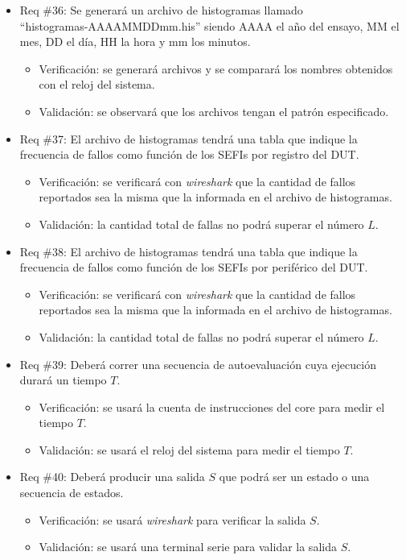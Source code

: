 \documentclass[
11pt, %
]{charter}
\begin{document}
\begin{itemize}
\item Req \#36: Se generará un archivo de histogramas llamado\\ ``histogramas-AAAAMMDDmm.his'' siendo AAAA el año del ensayo, MM el mes, DD el día, HH la hora y mm los minutos.
\begin{itemize}
    \item Verificación: se generará archivos y se comparará los nombres obtenidos con el reloj del sistema.
    \item Validación: se observará que los archivos tengan el patrón especificado.
\end{itemize}

\item Req \#37: El archivo de histogramas tendrá una tabla que indique la frecuencia de fallos como función de los SEFIs por registro del DUT.
\begin{itemize}
    \item Verificación: se verificará con \emph{wireshark} que la cantidad de fallos reportados sea la misma que la informada en el archivo de histogramas.
    \item Validación: la cantidad total de fallas no podrá superar el número $ L $.
\end{itemize}

\item Req \#38: El archivo de histogramas tendrá una tabla que indique la frecuencia de fallos como función de los SEFIs por periférico del DUT.
\begin{itemize}
    \item Verificación: se verificará con \emph{wireshark} que la cantidad de fallos reportados sea la misma que la informada en el archivo de histogramas.
    \item Validación: la cantidad total de fallas no podrá superar el número $ L $.
\end{itemize}

\item Req \#39: Deberá correr una secuencia de autoevaluación cuya ejecución durará un tiempo $ T $.
\begin{itemize}
    \item Verificación: se usará la cuenta de instrucciones del core para medir el tiempo $ T $.
    \item Validación: se usará el reloj del sistema para medir el tiempo $ T $.
\end{itemize}

\item Req \#40: Deberá producir una salida $ S $ que podrá ser un estado o una secuencia de estados.
\begin{itemize}
    \item Verificación: se usará \emph{wireshark} para verificar la salida $ S $.
    \item Validación: se usará una terminal serie para validar la salida $ S $.
\end{itemize}


\end{itemize}
\end{document}
